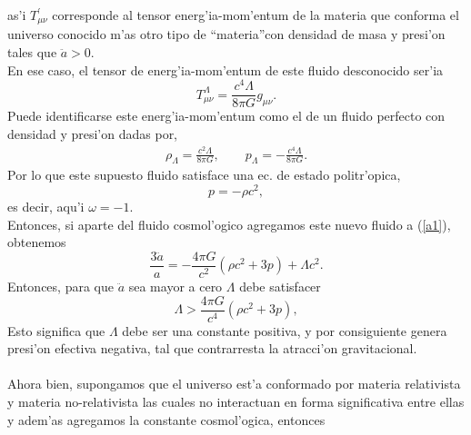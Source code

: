 as'i $T^{\prime}_{\mu \nu}$ corresponde al tensor energ'ia-mom'entum de la materia que conforma el universo conocido m'as 
otro tipo de \textquotedblleft materia\textquotedblright  con densidad de masa y presi'on tales que $\ddot a > 0$.\\
En ese caso, el tensor de energ'ia-mom'entum de este fluido desconocido ser'ia
\begin{equation}
T^{\Lambda}_{\mu\nu}=\frac{c^4\Lambda}{8\pi G} g_{\mu\nu}.
\end{equation}
Puede identificarse este energ'ia-mom'entum como el de un fluido perfecto con densidad y presi'on dadas por,
\begin{eqnarray}
\rho_{\Lambda}=\frac{c^2\Lambda}{8\pi G},    \qquad
p_{\Lambda}=-\frac{c^4\Lambda}{8\pi G}.
\end{eqnarray}
Por lo que este supuesto fluido satisface una ec. de estado politr'opica,
\begin{equation}
p=-\rho c^2,
\end{equation}
es decir, aqu'i  $\omega=-1$.\\
Entonces, si aparte del fluido cosmol'ogico agregamos este nuevo fluido a (\ref{a1}), obtenemos
\begin{equation}
\frac{3\ddot a}{a}=-\frac{4\pi G}{c^2}(\rho c^2+3p)+\Lambda c^2. 
\end{equation}
Entonces, para que $\ddot a$ sea mayor a cero $\Lambda$ debe satisfacer
\begin{equation}
\Lambda > \frac{4\pi G}{c^4}(\rho c^2 + 3p),
\end{equation}
Esto significa que $\Lambda$ debe ser una constante positiva, y por consiguiente genera presi'on efectiva negativa, tal que
contrarresta la atracci'on gravitacional.\\ \\
Ahora bien, supongamos que el universo est'a conformado por materia relativista y materia no-relativista las cuales no interactuan en forma significativa entre ellas  y adem'as agregamos la constante cosmol'ogica, entonces

